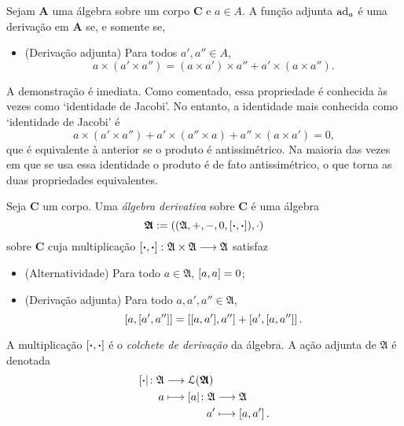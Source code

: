 \begin{proposition}
Sejam $\bm A$ uma álgebra sobre um corpo $\bm C$ e $a \in A$. A função adjunta $\operatorname{ad}_a$ é uma derivação em $\bm A$ se, e somente se,
	\begin{itemize}
	\item (Derivação adjunta) Para todos $a',a'' \in A$,
		\begin{equation*}
		a \times (a' \times a'') = (a \times a') \times a'' + a' \times (a \times a'').
		\end{equation*}
	\end{itemize}
\end{proposition}

A demonstração é imediata. Como comentado, essa propriedade é conhecida às vezes como `identidade de Jacobi'. No entanto, a identidade mais conhecida como `identidade de Jacobi' é
	\begin{equation*}
	a \times (a' \times a'') + a' \times (a'' \times a) + a'' \times (a \times a') = 0,
	\end{equation*}
que é equivalente à anterior se o produto é antissimétrico. Na maioria das vezes em que se usa essa identidade o produto é de fato antissimétrico, o que torna as duas propriedades equivalentes.

\begin{definition}
Seja $\bm C$ um corpo. Uma \emph{álgebra derivativa} sobre $\bm C$ é uma álgebra
	\begin{equation*}
	\bm{\mathfrak{A}} := ((\mathfrak{A},+,-,0,\left[{\bm{\cdot}},{\bm{\cdot}}\right]),\cdot)
	\end{equation*}
sobre $\bm C$ cuja multiplicação $\left[{\bm{\cdot}},{\bm{\cdot}}\right]\colon \allowbreak \mathfrak{A} \times \mathfrak{A} \longrightarrow \mathfrak{A}$ satisfaz
	\begin{itemize}
	\item (Alternatividade) Para todo $a \in \mathfrak{A}$, $\left[{a},{a}\right] = 0$;
	\item (Derivação adjunta) Para todo $a,a',a'' \in \mathfrak{A}$,
		\begin{equation*}
		\left[{a},{\left[{a'},{a''}\right]}\right] = \left[{\left[{a},{a'}\right]},{a''}\right] + \left[{a'},{\left[{a},{a''}\right]}\right].
		\end{equation*}
	\end{itemize}
A multiplicação $\left[{\bm{\cdot}},{\bm{\cdot}}\right]$ é o \emph{colchete de derivação} da álgebra. A ação adjunta de $\mathfrak{A}$ é denotada
	\begin{align*}
	\func{\ad{\var}}{\mathfrak{A}}{\lin(\bm{\mathfrak{A}})}{a}{
		\begin{aligned}[t]
		\func{\ad{a}}{\mathfrak{A}}{\mathfrak{A}}{a'}{\col{a}{a'}}.
		\end{aligned}
	}
	\end{align*}
\end{definition}

